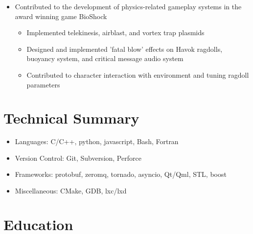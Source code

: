 \documentclass[11pt,a4paper,sans]{moderncv}        %
\begin{document}
\vspace{6pt}

\begin{itemize}

\item{}

  Contributed to the development of physics-related gameplay systems in the
  award winning game BioShock

  \begin{itemize}
    \item{Implemented telekinesis, airblast, and vortex trap plasmids}
    \item{Designed and implemented 'fatal blow' effects on Havok ragdolls, buoyancy system, and critical message audio system}
    \item{Contributed to character interaction with environment and tuning ragdoll parameters}
  \end{itemize}

\end{itemize}


\vspace{12pt}


\section{Technical Summary}

\vspace{5pt}

\begin{itemize}
  \item{Languages: C/C++, python, javascript, Bash, Fortran}
  \item{Version Control: Git, Subversion, Perforce}
  \item{Frameworks: protobuf, zeromq, tornado, asyncio, Qt/Qml, STL, boost}
  \item{Miscellaneous: CMake, GDB, lxc/lxd}
\end{itemize}


\vspace{12pt}


\section{Education}

\vspace{5pt}
\end{document}
